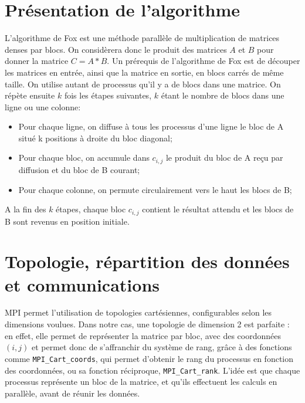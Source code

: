 \documentclass[a4paper,11pt]{article}
\begin{document}
\section{Présentation de l'algorithme}
L'algorithme de Fox est une méthode parallèle de multiplication de matrices denses par blocs. On considèrera donc le produit des matrices $A$ et $B$ pour donner la matrice $C=A*B$.
Un prérequis de l'algorithme de Fox est de découper les matrices en entrée, ainsi que la matrice en sortie, en blocs carrés de même taille. On utilise autant de processus qu'il y a de blocs dans une matrice.
On répète ensuite $k$ fois les étapes suivantes, $k$ étant le nombre de blocs dans une ligne ou une colonne:
\begin{itemize}
\item Pour chaque ligne, on diffuse à tous les processus d'une ligne le bloc de A situé k positions à droite du bloc diagonal;
\item Pour chaque bloc, on accumule dans $c_{i,j}$ le produit du bloc de A reçu par diffusion et du bloc de B courant;  
\item Pour chaque colonne, on permute circulairement vers le haut les blocs de B;
\end{itemize}

A la fin des $k$ étapes, chaque bloc $c_{i,j}$ contient le résultat attendu et les blocs de B sont revenus en position initiale.


\section{Topologie, répartition des données et communications}
MPI permet l'utilisation de topologies cartésiennes, configurables selon les dimensions voulues. Dans notre cas, une topologie de dimension 2 est parfaite : en effet, elle permet de représenter la matrice par bloc, avec des coordonnées $(i,j)$ et permet donc de s'affranchir du système de rang, grâce à des fonctions comme \texttt{MPI\_Cart\_coords}, qui permet d'obtenir le rang du processus en fonction des coordonnées, ou sa fonction réciproque, \texttt{MPI\_Cart\_rank}.
L'idée est que chaque processus représente un bloc de la matrice, et qu'ils effectuent les calculs en parallèle, avant de réunir les données.\\
\end{document}
